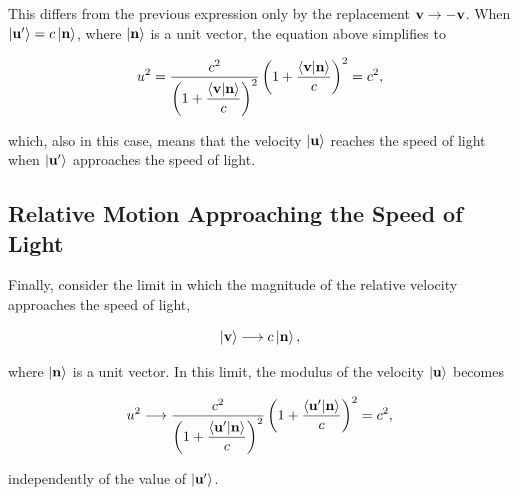 \documentclass[12pt]{article}
\begin{document}
This differs from the previous expression only by the replacement
$\vb{v}\rightarrow-\vb{v}$. When $\ket{\vb{u}'} = c\ket{\vb{n}}$, where
$\ket{\vb{n}}$ is a unit vector, the equation above simplifies to

\[
  u^2
  =
  \frac{c^2}{
    \displaystyle
    \left(
      1 + \frac{\ip{\vb{v}}{\vb{n}}}{c}
    \right)^2
  }
  \left(
    1 + \frac{\ip{\vb{v}}{\vb{n}}}{c}
  \right)^2
  =
  c^2,
\]

which, also in this case, means that the velocity $\ket{\vb{u}}$ reaches the speed of light
when $\ket{\vb{u}'}$ approaches the speed of light.

\subsection{Relative Motion Approaching the Speed of Light}

Finally, consider the limit in which the magnitude of the relative velocity approaches the
speed of light,

\[
  \ket{\vb{v}} \longrightarrow c\ket{\vb{n}},
\]

where $\ket{\vb{n}}$ is a unit vector. In this limit, the modulus of the velocity
$\ket{\vb{u}}$ becomes

\[
  u^2
  \longrightarrow
  \frac{c^2}{
    \displaystyle
    \left(
      1 + \frac{\ip{\vb{u}'}{\vb{n}}}{c}
    \right)^2
  }
  \left(
    1 + \frac{\ip{\vb{u}'}{\vb{n}}}{c}
  \right)^2
  =
  c^2,
\]

independently of the value of $\ket{\vb{u}'}$.
\end{document}
